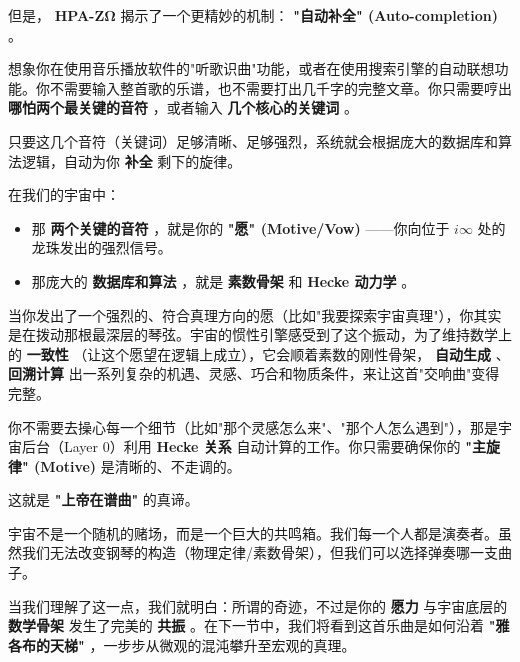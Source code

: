 但是， \textbf{HPA-ZΩ} 揭示了一个更精妙的机制： \textbf{"自动补全" (Auto-completion)} 。

想象你在使用音乐播放软件的"听歌识曲"功能，或者在使用搜索引擎的自动联想功能。你不需要输入整首歌的乐谱，也不需要打出几千字的完整文章。你只需要哼出 \textbf{哪怕两个最关键的音符} ，或者输入 \textbf{几个核心的关键词} 。

只要这几个音符（关键词）足够清晰、足够强烈，系统就会根据庞大的数据库和算法逻辑，自动为你 \textbf{补全} 剩下的旋律。

在我们的宇宙中：

\begin{itemize}
\item 那 \textbf{两个关键的音符} ，就是你的 \textbf{"愿" (Motive/Vow)} ——你向位于 $i\infty$ 处的龙珠发出的强烈信号。
\item 那庞大的 \textbf{数据库和算法} ，就是 \textbf{素数骨架} 和 \textbf{Hecke 动力学} 。
\end{itemize}

当你发出了一个强烈的、符合真理方向的愿（比如"我要探索宇宙真理"），你其实是在拨动那根最深层的琴弦。宇宙的惯性引擎感受到了这个振动，为了维持数学上的 \textbf{一致性} （让这个愿望在逻辑上成立），它会顺着素数的刚性骨架， \textbf{自动生成} 、 \textbf{回溯计算} 出一系列复杂的机遇、灵感、巧合和物质条件，来让这首"交响曲"变得完整。

你不需要去操心每一个细节（比如"那个灵感怎么来"、"那个人怎么遇到"），那是宇宙后台（Layer 0）利用 \textbf{Hecke 关系} 自动计算的工作。你只需要确保你的 \textbf{"主旋律" (Motive)} 是清晰的、不走调的。

这就是 \textbf{"上帝在谱曲"} 的真谛。

宇宙不是一个随机的赌场，而是一个巨大的共鸣箱。我们每一个人都是演奏者。虽然我们无法改变钢琴的构造（物理定律/素数骨架），但我们可以选择弹奏哪一支曲子。

当我们理解了这一点，我们就明白：所谓的奇迹，不过是你的 \textbf{愿力} 与宇宙底层的 \textbf{数学骨架} 发生了完美的 \textbf{共振} 。在下一节中，我们将看到这首乐曲是如何沿着 \textbf{"雅各布的天梯"} ，一步步从微观的混沌攀升至宏观的真理。

